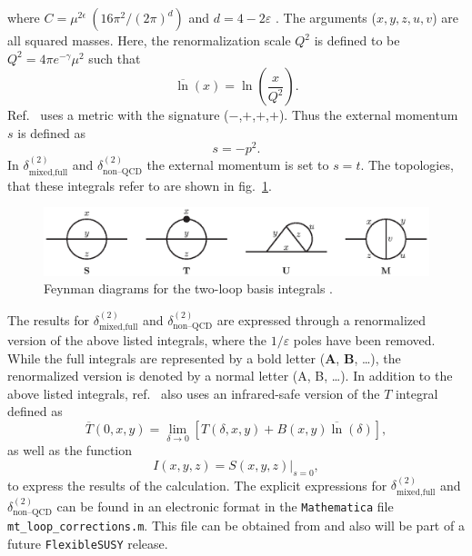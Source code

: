 \documentclass[a4paper,12pt]{book}
\begin{document}
where $C=\mu^{2\epsilon}\> (16 \pi^2/(2 \pi)^d)$ and $d=4-2\varepsilon$  \cite{martinloops}. The arguments ($x,y,z,u,v$) are all squared masses. Here, the renormalization scale $Q^2$ is defined to be $Q^2 = 4 \pi e^{-\gamma} \mu^2 $ \cite{martinloops} such that 
\begin{equation}
\overline{\ln}(x)=\ln\left(\frac{x}{Q^2}\right).
\end{equation} 
Ref.\ \cite{martinmain} uses a metric with the signature ($-$,$+$,$+$,$+$). Thus the external momentum $s$ is defined as
\begin{equation}
s= -p^2.
\end{equation}
In  $\delta^{(2)}_\text{mixed,full}$ and $\delta^{(2)}_\text{non--QCD}$ the external momentum is set to $s=t$. The topologies, that these integrals refer to are shown in fig.\ \ref{fig::twoloopdiagrams}.
\begin{figure}[h]
\begin{center}
\includegraphics[width=1\textwidth]{src/feynman/twoloopdiagrams.ps}
\caption{\label{fig:STUM} Feynman diagrams for the two-loop basis 
integrals \cite{martinloops}.}
\label{fig::twoloopdiagrams}
\end{center}
\end{figure}
The results for $\delta^{(2)}_\text{mixed,full}$ and $\delta^{(2)}_\text{non--QCD}$ are expressed through a renormalized version of the above listed integrals, where the $1/\varepsilon$ poles have been removed. While the full integrals are represented by a bold letter (\textbf{A}, \textbf{B}, \ldots), the renormalized version is denoted by a normal letter (A, B, \ldots). In addition to the above listed integrals, ref.\ \cite{martinmain} also uses an infrared-safe version of the $T$ integral defined as
\begin{equation}
\label{eq::Tbar}
\overline{T}(0,x,y) = \lim_{\delta \rightarrow 0}\left[T(\delta,x,y)+B(x,y)\overline{\ln}(\delta)\right],
\end{equation}
as well as the function 
\begin{equation}
I(x,y,z) = S(x,y,z)|_{s=0},
\end{equation}
to express the results of the calculation. The explicit expressions for $\delta^{(2)}_\text{mixed,full}$ and $\delta^{(2)}_\text{non--QCD}$ can be found in an electronic format in the \texttt{Mathematica} file \texttt{mt\_loop\_corrections.m}. This file can be obtained from \cite{github} and also will be part of a future \texttt{FlexibleSUSY} release.\par
\end{document}
